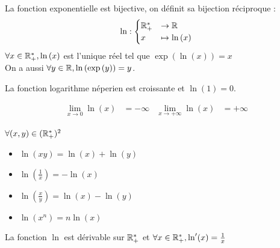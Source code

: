 \begin{graybox}
	\begin{definition}
		La fonction exponentielle est bijective, on définit sa bijection réciproque :
		\begin{align*}
			\ln : 
			\begin{cases}
				\mathbb{R}^*_+ &\to \mathbb{R} \\
				x &\mapsto \ln{(x)}        
			\end{cases}
		\end{align*}
		$\forall x \in \mathbb{R}^*_+, \ln{(x)}$ est l'unique réel tel que $\exp{\left(\ln{\left(x \right)}\right)} = x$ \\
		On a aussi $\forall y \in \mathbb{R}, \ln{(\exp{(y)})} = y$.
	\end{definition}
\end{graybox}


\begin{graybox}
	\begin{proposition}
		La fonction logarithme néperien est croissante et $\ln{(1)} = 0$.    
	\end{proposition}
\end{graybox}

\begin{graybox}
	\begin{proposition}
		\begin{align*}
			\lim_{x \to 0} \ln{(x)} &= -\infty & \lim_{x \to +\infty} \ln{(x)} &= +\infty
		\end{align*}
	\end{proposition}
\end{graybox}

\begin{graybox}
	\begin{proposition}
		$\forall (x,y) \in (\mathbb{R}^*_+)^2$
		\begin{itemize}
			\item $\ln(xy) = \ln(x) + \ln(y)$
			\item $\ln(\frac{1}{x}) = -\ln(x)$
			\item $\ln(\frac{x}{y}) = \ln(x) - \ln(y)$
			\item $\ln(x^n) = n \ln(x)$
		\end{itemize}
	\end{proposition}
\end{graybox}

\begin{graybox}
	\begin{proposition}
		La fonction $\ln$ est dérivable sur $\mathbb{R}^*_+$ et $\forall x \in \mathbb{R}^*_+, \ln'(x) = \frac{1}{x}$
	\end{proposition}
\end{graybox}

